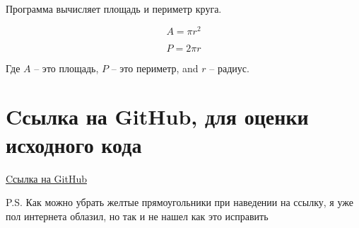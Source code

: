 \documentclass{article}
\begin{document}
Программа вычисляет площадь и периметр круга.

\begin{equation}
A = \pi r^2
\end{equation}

\begin{equation}
P = 2\pi r
\end{equation}

Где $A$ -- это площадь, $P$ -- это периметр, and $r$ -- радиус.

\section{Cсылка на GitHub, для оценки исходного кода}

\href{https://github.com/Razboynik-Vlad/geometric_lib}{Cсылка на GitHub}

\newpage
P.S. Как можно убрать желтые прямоугольники при наведении на ссылку, я уже пол интернета облазил, но так и не нашел как это исправить
\end{document}
